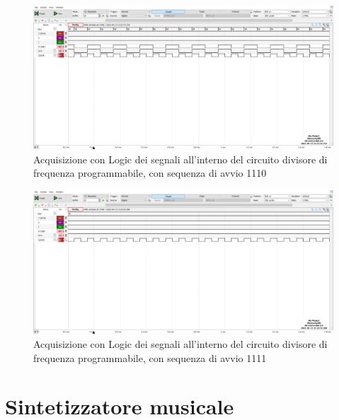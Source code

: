 \documentclass[10pt, a4paper, italian]{article}
\begin{document}
\begin{figure}[htbp]
\centering
	\includegraphics[width=\textwidth]{5.f_1110}
	\caption{Acquisizione con Logic dei segnali all'interno del circuito divisore di frequenza programmabile, con sequenza di avvio 1110}
\end{figure}
\begin{figure}[htbp]
\centering
	\includegraphics[width=\textwidth]{5.f_1111}
	\caption{Acquisizione con Logic dei segnali all'interno del circuito divisore di frequenza programmabile, con sequenza di avvio 1111}
\end{figure}
\section{Sintetizzatore musicale}

\end{document}
